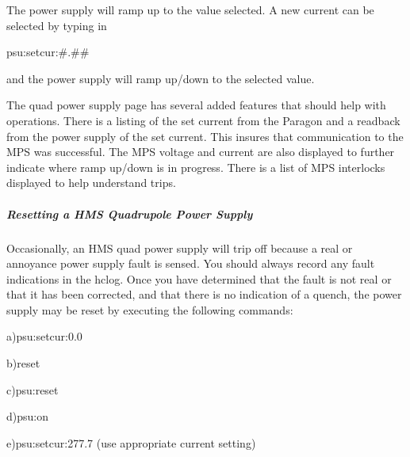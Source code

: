 \begin{description}
\item{}\hskip0.3in The power supply will ramp up to the value selected.  A new
current can be selected by typing in
\end{description}

\begin{center}
psu:setcur:\#.\#\#
\end{center}

\begin{description}
\item{}\hskip0.3in and the power supply will ramp up/down to the selected value.
\medskip
\item{}\hskip0.3in The quad power supply page has several added features that
should help with operations.  There is a listing of the set current from the
Paragon and a readback from the power supply of the set current.  This
insures that communication to the MPS was successful.  The MPS voltage
and current are also displayed to further indicate where ramp up/down is
in progress.  There is a list of MPS interlocks displayed to help
understand trips.
\end{description}


\subparagraph{Resetting a HMS Quadrupole Power Supply}
\begin{description}
\item{}\hskip0.3in Occasionally, an HMS quad power supply will trip
off because a real or annoyance power supply fault is sensed. You
should always record any fault indications in the hclog. Once
you have determined that the fault is not real or that it has been
corrected, and that there is no indication of a quench, the power
supply may be reset by executing the following commands:
\end{description}

\begin{description}
\item{}\hskip0.5in a)psu:setcur:0.0
\item{}\hskip0.5in b)reset
\item{}\hskip0.5in c)psu:reset
\item{}\hskip0.5in d)psu:on
\item{}\hskip0.5in e)psu:setcur:277.7 (use appropriate current setting)
\end{description}

